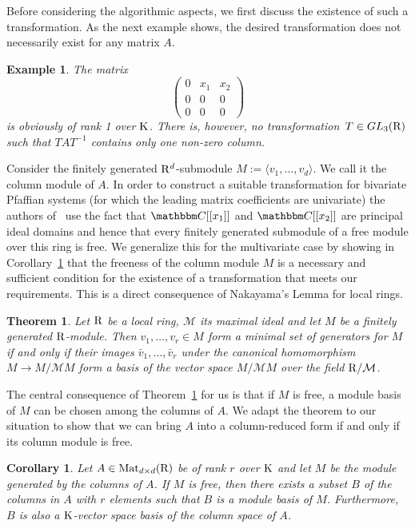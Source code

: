 \documentclass[final,1p,times,number,amsthm]{elsart}
\newtheorem{theorem}[lemma]{Theorem}
\newtheorem{corollary}[lemma]{Corollary}
\newtheorem{example}[lemma]{Example}
\let\set\mathbbm
\begin{document}
\medskip
Before considering the algorithmic aspects,
we first discuss the existence of such a transformation. As the next example
shows, the desired transformation does not necessarily exist for any matrix $A$.
\begin{example}
The matrix
\[
\left(\begin{matrix}
0          & x_1 & x_2\\
0   & 0 & 0\\
0 & 0 & 0
\end{matrix}\right)
\]
is obviously of rank 1 over $\rm K$. There is, however, no
transformation~$T\in GL_3({\rm R})$ such that $TAT^{-1}$ contains only one
non-zero column.
\end{example}
Consider the finitely generated ${\rm R}^d$-submodule
$M:=\langle v_{1},\dots,v_{d}\rangle$. We call it the column module of $A$. In
order to construct a suitable transformation for bivariate Pfaffian systems (for
which the leading matrix coefficients are univariate) the authors
of~\cite{key101} use the fact that $\set C[[x_1]]$ and $\set C[[x_2]]$ are
principal ideal domains and hence that every finitely generated submodule of a
free module over this ring is free. We generalize this for the multivariate case
by showing in Corollary~\ref{cor:basis} that the freeness of the column module
$M$ is a necessary and sufficient condition for the existence of a
transformation that meets our requirements. This is a direct consequence of
Nakayama's Lemma for local rings.

\begin{theorem} \cite[Theorem 2.3, pp 8]{key900}
  \label{theo:naka}
  Let $\rm R$ be a local ring, $\mathcal{M}$ its maximal ideal and let $M$ be a
  finitely generated $\rm R$-module. Then $v_1,\dots,v_r\in M$ form a minimal
  set of generators for $M$ if and only if their images
  $\bar{v}_1,\dots,\bar{v}_r$ under the canonical homomorphism
  $M\rightarrow M/\mathcal{M}M$ form a basis of the vector space
  $M/\mathcal{M}M$ over the field ${\rm R}/\mathcal{M}$.
\end{theorem}

The central consequence of Theorem~\ref{theo:naka} for us is that if $M$ is
free, a module basis of $M$ can be chosen among the columns of $A$. We adapt the
theorem to our situation to show that we can bring $A$ into a column-reduced
form if and only if its column module is free.

\begin{corollary}
  \label{cor:basis}
  Let $A\in\operatorname{Mat}_{d\times d}({\rm R})$ be of rank $r$ over $\rm K$
  and let $M$ be the module generated by the columns of $A$. If $M$ is free,
  then there exists a subset $B$ of the columns in $A$ with $r$ elements such
  that $B$ is a module basis of $M$. Furthermore, $B$ is also a $\rm K$-vector
  space basis of the column space of $A$.
\end{corollary}
\end{document}
